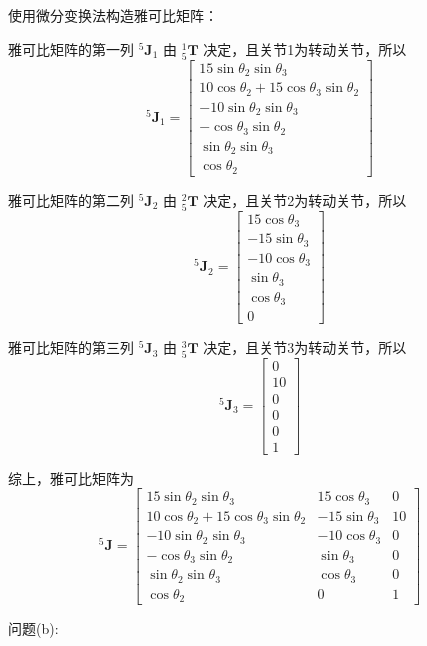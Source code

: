 \documentclass{homework}
\begin{document}
\begin{sol}
使用微分变换法构造雅可比矩阵：

雅可比矩阵的第一列 $ {^5}\mathbf{J}_1 $ 由 $ _5^1\mathbf{T} $ 决定，且关节1为转动关节，所以
\[
  {^5}\mathbf{J}_1 =
  \begin{bmatrix}
    15 \sin\theta_2 \sin\theta_3 \\
    10 \cos\theta_2 + 15 \cos\theta_3 \sin\theta_2 \\
    -10 \sin\theta_2 \sin\theta_3 \\
    -\cos\theta_3 \sin\theta_2 \\
    \sin\theta_2 \sin\theta_3 \\
    \cos\theta_2
  \end{bmatrix}
\]

雅可比矩阵的第二列 $ {^5}\mathbf{J}_2 $ 由 $ _5^2\mathbf{T} $ 决定，且关节2为转动关节，所以
\[
  {^5}\mathbf{J}_2 =
  \begin{bmatrix}
    15 \cos\theta_3 \\
    -15 \sin\theta_3 \\
    -10 \cos\theta_3 \\
    \sin\theta_3 \\
    \cos\theta_3 \\
    0
  \end{bmatrix}
\]

雅可比矩阵的第三列 $ {^5}\mathbf{J}_3 $ 由 $ _5^3\mathbf{T} $ 决定，且关节3为转动关节，所以
\[
  {^5}\mathbf{J}_3 =
  \begin{bmatrix}
    0 \\
    10 \\
    0 \\
    0 \\
    0 \\
    1
  \end{bmatrix}
\]

综上，雅可比矩阵为
\[
  {^5}\mathbf{J} =
  \begin{bmatrix}
    15 \sin\theta_2 \sin\theta_3 & 15 \cos\theta_3 & 0 \\
    10 \cos\theta_2 + 15 \cos\theta_3 \sin\theta_2 & -15 \sin\theta_3 & 10 \\
    -10 \sin\theta_2 \sin\theta_3 & -10 \cos\theta_3 & 0 \\
    -\cos\theta_3 \sin\theta_2 & \sin\theta_3 & 0 \\
    \sin\theta_2 \sin\theta_3 & \cos\theta_3 & 0 \\
    \cos\theta_2 & 0 & 1
  \end{bmatrix}
\]

问题(b):


\end{sol}
\end{document}
